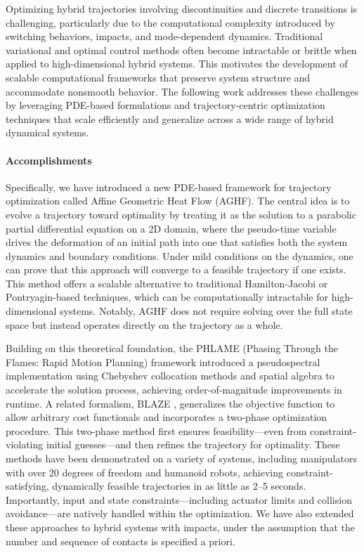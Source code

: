 \documentclass[letterpaper,11pt]{article}
\begin{document}
Optimizing hybrid trajectories involving discontinuities and discrete transitions is challenging, particularly due to the computational complexity introduced by switching behaviors, impacts, and mode-dependent dynamics. 
Traditional variational and optimal control methods often become intractable or brittle when applied to high-dimensional hybrid systems. 
This motivates the development of scalable computational frameworks that preserve system structure and accommodate nonsmooth behavior. 
The following work addresses these challenges by leveraging PDE-based formulations and trajectory-centric optimization techniques that scale efficiently and generalize across a wide range of hybrid dynamical systems.

\paragraph{Accomplishments}

Specifically, we have introduced a new PDE-based framework for trajectory optimization called Affine Geometric Heat Flow (AGHF).
The central idea is to evolve a trajectory toward optimality by treating it as the solution to a parabolic partial differential equation on a 2D domain, where the pseudo-time variable drives the deformation of an initial path into one that satisfies both the system dynamics and boundary conditions.
Under mild conditions on the dynamics, one can prove that this approach will converge to a feasible trajectory if one exists.
This method offers a scalable alternative to traditional Hamilton-Jacobi or Pontryagin-based techniques, which can be computationally intractable for high-dimensional systems.
Notably, AGHF does not require solving over the full state space but instead operates directly on the trajectory as a whole.

Building on this theoretical foundation, the PHLAME (Phasing Through the Flames: Rapid Motion Planning) framework \cite{adu2025phasing} introduced a pseudospectral implementation using Chebyshev collocation methods and spatial algebra to accelerate the solution process, achieving order-of-magnitude improvements in runtime.
A related formalism, BLAZE \cite{adu2025bring}, generalizes the objective function to allow arbitrary cost functionals and incorporates a two-phase optimization procedure.
This two-phase method first ensures feasibility—even from constraint-violating initial guesses—and then refines the trajectory for optimality.
These methods have been demonstrated on a variety of systems, including manipulators with over 20 degrees of freedom and humanoid robots, achieving constraint-satisfying, dynamically feasible trajectories in as little as 2–5 seconds.
Importantly, input and state constraints—including actuator limits and collision avoidance—are natively handled within the optimization.
We have also extended these approaches to hybrid systems with impacts, under the assumption that the number and sequence of contacts is specified a priori.
\end{document}
